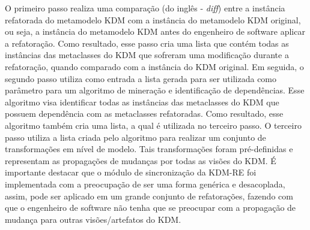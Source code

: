 O primeiro passo realiza uma comparação (do inglês - \textit{diff}) entre a instância refatorada do metamodelo KDM com a instância do metamodelo KDM original, ou seja, a instância do metamodelo KDM antes do engenheiro de software aplicar a refatoração. Como resultado, esse passo cria uma lista que contém todas as instâncias das metaclasses do KDM que sofreram uma modificação durante a refatoração, quando comparado com a instância do KDM original. Em seguida, o segundo passo utiliza como entrada a lista gerada para ser utilizada como parâmetro para um algoritmo de mineração e identificação de dependências. Esse algoritmo visa identificar todas as instâncias das metaclasses do KDM que possuem dependência com as metaclasses refatoradas. Como resultado, esse algoritmo também cria uma lista, a qual é utilizada no terceiro passo. O terceiro passo utiliza a lista criada pelo algoritmo para realizar um conjunto de transformações em nível de modelo. Tais transformações foram pré-definidas e representam as propagações de mudanças por todas as visões do KDM. É importante destacar que o módulo de sincronização da KDM-RE foi implementada com a preocupação de ser uma forma genérica e desacoplada, assim, pode ser aplicado em um grande conjunto de refatorações, fazendo com que o engenheiro de software não tenha que se preocupar com a propagação de mudança para outras visões/artefatos do KDM. 




